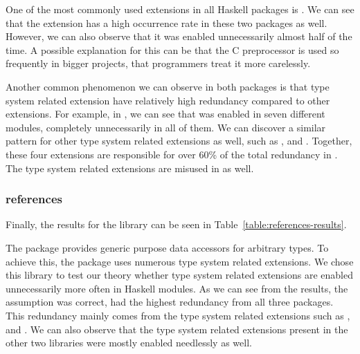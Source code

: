 \documentclass[main.tex]{subfiles}
\begin{document}
	One of the most commonly used extensions in all Haskell packages is . We can see that the extension has a high occurrence rate in these two packages as well. However, we can also observe that it was enabled unnecessarily almost half of the time. A possible explanation for this can be that the C preprocessor is used so frequently in bigger projects, that programmers treat it more carelessly.
	
	
	Another common phenomenon we can observe in both packages is that type system related extension have relatively high redundancy compared to other extensions. For example, in , we can see that  was enabled in seven different modules, completely unnecessarily in all of them. We can discover a similar pattern for other type system related extensions as well, such as ,  and . Together, these four extensions are responsible for over 60\% of the total redundancy in . The type system related extensions are misused in  as well.
	
	\subsubsection{references}
	
	Finally, the results for the  library can be seen in Table~\ref{table:references-results}.
	
	The  package provides generic purpose data accessors for arbitrary types. To achieve this, the package uses numerous type system related extensions.	We chose this library to test our theory whether type system related extensions are enabled unnecessarily more often in Haskell modules. As we can see from the results, the assumption was correct,  had the highest redundancy from all three packages. This redundancy mainly comes from the type system related extensions such as ,  and . We can also observe that the type system related extensions present in the other two libraries were mostly enabled needlessly as well.
	
\end{document}
